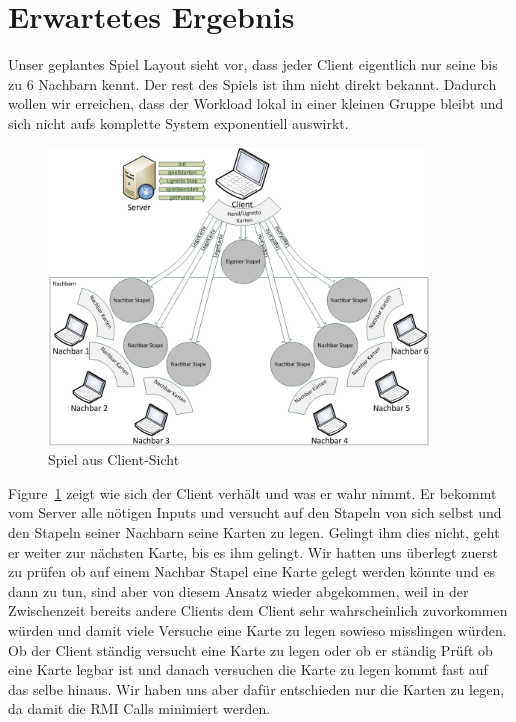 \section{Erwartetes Ergebnis} 

Unser geplantes Spiel Layout sieht vor, dass jeder Client eigentlich nur seine bis zu 6 Nachbarn kennt. Der rest des Spiels ist ihm nicht direkt bekannt. Dadurch wollen wir erreichen, dass der Workload lokal in einer kleinen Gruppe bleibt und sich nicht aufs komplette System exponentiell auswirkt.

\begin{figure}[hbt]
  \centering
  \includegraphics[width=0.9\textwidth,angle=0]{graphics/SpielLayout.png}
  \caption{Spiel aus Client-Sicht \hfill{} }
  \label{ergebnisspiellayout}
 \end{figure}

Figure~\ref{ergebnisspiellayout} zeigt wie sich der Client verhält und was er wahr nimmt.
Er bekommt vom Server alle nötigen Inputs und versucht auf den Stapeln von sich selbst und den Stapeln seiner Nachbarn seine Karten zu legen. Gelingt ihm dies nicht, geht er weiter zur nächsten Karte, bis es ihm gelingt. Wir hatten uns überlegt zuerst zu prüfen ob auf einem Nachbar Stapel eine Karte gelegt werden könnte und es dann zu tun, sind aber von diesem Ansatz wieder abgekommen, weil in der Zwischenzeit bereits andere Clients dem Client sehr wahrscheinlich zuvorkommen würden und damit viele Versuche eine Karte zu legen sowieso misslingen würden. Ob der Client ständig versucht eine Karte zu legen oder ob er ständig Prüft ob eine Karte legbar ist und danach versuchen die Karte zu legen kommt fast auf das selbe hinaus. Wir haben uns aber dafür entschieden nur die Karten zu legen, da damit die RMI Calls minimiert werden.


